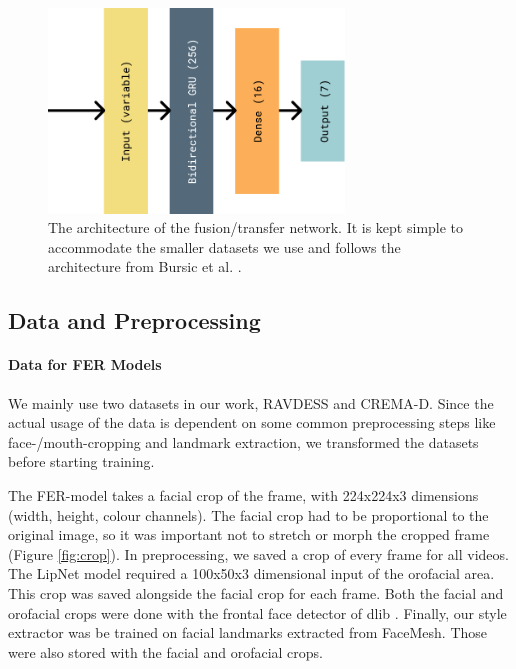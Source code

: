\begin{figure}
    \centering
    \includegraphics[width=0.7\textwidth]{res/FusionLayers.pdf}
    \caption{The architecture of the fusion/transfer network. It is kept simple to accommodate the smaller datasets we use and follows the architecture from Bursic et al. \cite{bursic2020improving}.}
    \label{fig:fusionlayers}
\end{figure}
\subsection{Data and Preprocessing}
\paragraph{Data for FER Models}
We mainly use two datasets in our work, RAVDESS and CREMA-D. Since the actual usage of the data is dependent on some common preprocessing steps like face-/mouth-cropping and landmark extraction, we transformed the datasets before starting training.

The FER-model takes a facial crop of the frame, with 224x224x3 dimensions (width, height, colour channels). The facial crop had to be proportional to the original image, so it was important not to stretch or morph the cropped frame (Figure \ref{fig:crop}). In preprocessing, we saved a crop of every frame for all videos. 
The LipNet model required a 100x50x3 dimensional input of the orofacial area. This crop was saved alongside the facial crop for each frame. Both the facial and orofacial crops were done with the frontal face detector of dlib \cite{dlib09}. Finally, our style extractor was be trained on facial landmarks extracted from FaceMesh. Those were also stored with the facial and orofacial crops.

